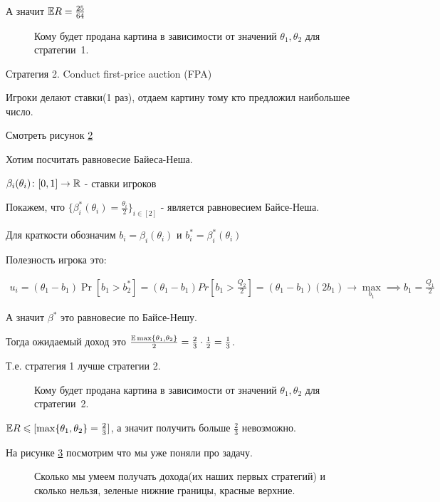 \begin{exmpl}
	А значит $\mathbb E R = \frac{25}{64}$ 

\begin{figure}[ht]
    \centering
    \caption{Кому будет продана картина в зависимости от значений $\theta_1, \theta_2$ для стратегии~1.}
    \label{fig:rasp_example_3_lec}
\end{figure}

	Стратегия 2. Conduct first-price auction (FPA)

	Игроки делают ставки(1 раз), отдаем картину тому кто предложил наибольшее число.

	Смотреть рисунок \ref{fig:rasp_example_strategy_2_3_lec}

	Хотим посчитать равновесие Байеса-Неша.

	$\beta_i(\theta_i) \colon [0, 1] \to \mathbb{R}$ - ставки игроков

	Покажем, что $\{ \beta_i^*(\theta_i) = \frac{\theta_i}{2}\}_{i\in [2]}$ - является равновесием Байсе-Неша.

	Для краткости обозначим $b_i = \beta_i(\theta_i)$ и $b_i^* = \beta_i^*(\theta_i)$

	Полезность игрока это:


	\begin{align*}
		u_i = (\theta_1 - b_1) \Pr[b_1 > b_2^*] = (\theta_1 - b_1) Pr\left[b_1 > \frac{Q_2}{2}\right] = (\theta_1 - b_1)(2 b_1) \to \max_{b_1} \implies b_1 = \frac{Q_1}{2}
	\end{align*}

	А значит $\beta^*$ это равновесие по Байсе-Нешу.

	Тогда ожидаемый доход это  $\frac{\mathbb E \max\{\theta_1, \theta_2\}}{2} = \frac{2}{3} \cdot \frac{1}{2} = \frac{1}{3}$.


	Т.е. стратегия 1 лучше стратегии 2.

\begin{figure}[ht]
    \centering
    \caption{Кому будет продана картина в зависимости от значений $\theta_1, \theta_2$ для стратегии~2.}
    \label{fig:rasp_example_strategy_2_3_lec}
\end{figure}

$\mathbb E R \leqslant [\max \{\theta_1, \theta_2\} = \frac{2}{3}]$, а значит получить больше $\frac{2}{3}$ невозможно.

На рисунке \ref{fig:rasp_example_line_win_amount} посмотрим что мы уже поняли про задачу.

\begin{figure}[ht]
    \centering
    \caption{Сколько мы умеем получать дохода(их наших первых стратегий) и сколько нельзя, зеленые нижние границы, красные верхние.}
    \label{fig:rasp_example_line_win_amount}
\end{figure}


\end{exmpl}
